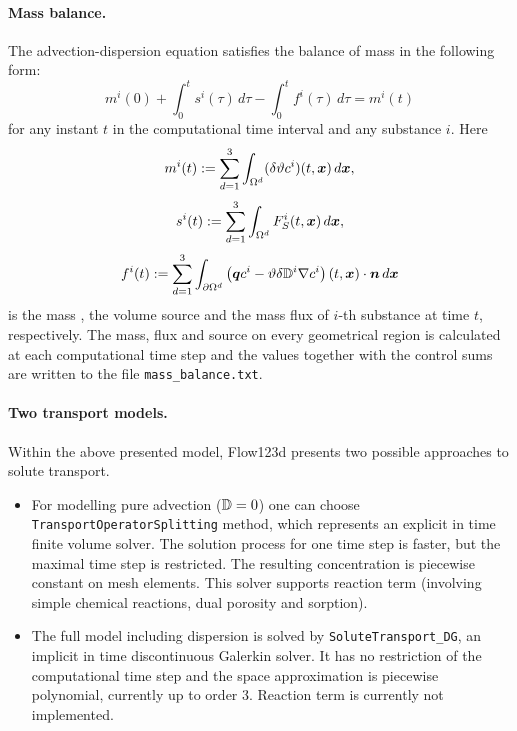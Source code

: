 \paragraph{Mass balance.}
The advection-dispersion equation satisfies the balance of mass in the following form:
$$ m^i(0) + \int_0^t s^i(\tau) \,d\tau - \int_0^t f^i(\tau) \,d\tau = m^i(t) $$
for any instant $t$ in the computational time interval and any substance $i$.
Here
$$ m^i(t) := \sum_{d=1}^3\int_{\Omega^d}(\delta\vartheta c^i)(t,\mathbf{\boldsymbol{x}})\,d\mathbf{\boldsymbol{x}}, $$
$$ s^i(t) := \sum_{d=1}^3\int_{\Omega^d}F_S^i(t,\mathbf{\boldsymbol{x}})\,d\mathbf{\boldsymbol{x}}, $$
$$ f^i(t) := \sum_{d=1}^3\int_{\partial\Omega^d}\left(\mathbf{\boldsymbol{q}} c^i - \vartheta\delta{{\mathbb{D}}}^i\nabla c^i\right)(t,\mathbf{\boldsymbol{x}})\cdot\mathbf{\boldsymbol{n}} \,d\mathbf{\boldsymbol{x}} $$
is the mass , the volume source  and the mass flux  of $i$-th substance at time $t$, respectively.
The mass, flux and source on every geometrical region is calculated at each computational time step and the values together with the control sums are written to the file \texttt{mass\_balance.txt}.


\paragraph{Two transport models.}
Within the above presented model, Flow123d presents two possible approaches to solute transport.
\begin{itemize}
\item For modelling pure advection (${\mathbb{D}}=0$) one can choose {\tt TransportOperatorSplitting} method, which represents an explicit in time finite volume solver. The solution process for one time step is faster, but the maximal time step is restricted. The resulting concentration is piecewise constant on mesh elements. This solver supports reaction term (involving simple chemical reactions, dual porosity and sorption).
\item The full model including dispersion is solved by {\tt SoluteTransport\_DG}, an implicit in time discontinuous Galerkin solver. It has no restriction of the computational time step and the space approximation is piecewise polynomial, currently up to order 3. Reaction term is currently not implemented.
\end{itemize}



